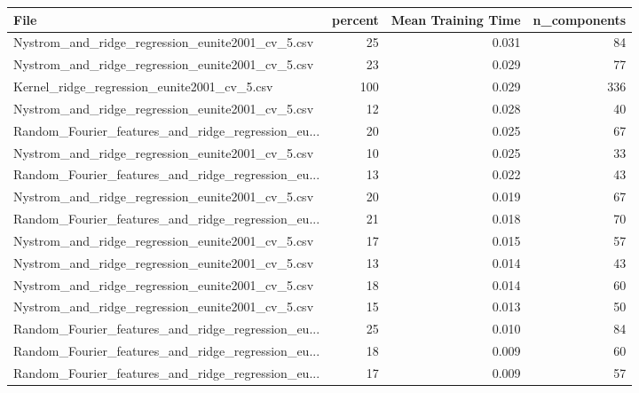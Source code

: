 \begin{tabularx}{\textwidth}{lrrr}
\toprule
                                              File &  percent &  Mean Training Time &  n\_components \\
\midrule
  Nystrom\_and\_ridge\_regression\_eunite2001\_cv\_5.csv &       25 &               0.031 &            84 \\
  Nystrom\_and\_ridge\_regression\_eunite2001\_cv\_5.csv &       23 &               0.029 &            77 \\
       Kernel\_ridge\_regression\_eunite2001\_cv\_5.csv &      100 &               0.029 &           336 \\
  Nystrom\_and\_ridge\_regression\_eunite2001\_cv\_5.csv &       12 &               0.028 &            40 \\
Random\_Fourier\_features\_and\_ridge\_regression\_eu... &       20 &               0.025 &            67 \\
  Nystrom\_and\_ridge\_regression\_eunite2001\_cv\_5.csv &       10 &               0.025 &            33 \\
Random\_Fourier\_features\_and\_ridge\_regression\_eu... &       13 &               0.022 &            43 \\
  Nystrom\_and\_ridge\_regression\_eunite2001\_cv\_5.csv &       20 &               0.019 &            67 \\
Random\_Fourier\_features\_and\_ridge\_regression\_eu... &       21 &               0.018 &            70 \\
  Nystrom\_and\_ridge\_regression\_eunite2001\_cv\_5.csv &       17 &               0.015 &            57 \\
  Nystrom\_and\_ridge\_regression\_eunite2001\_cv\_5.csv &       13 &               0.014 &            43 \\
  Nystrom\_and\_ridge\_regression\_eunite2001\_cv\_5.csv &       18 &               0.014 &            60 \\
  Nystrom\_and\_ridge\_regression\_eunite2001\_cv\_5.csv &       15 &               0.013 &            50 \\
Random\_Fourier\_features\_and\_ridge\_regression\_eu... &       25 &               0.010 &            84 \\
Random\_Fourier\_features\_and\_ridge\_regression\_eu... &       18 &               0.009 &            60 \\
Random\_Fourier\_features\_and\_ridge\_regression\_eu... &       17 &               0.009 &            57 \\

\end{tabularx}
